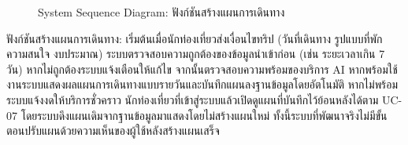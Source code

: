 \begin{figure}[H]
\centering
{}
\caption{System Sequence Diagram: ฟังก์ชันสร้างแผนการเดินทาง}
\label{fig:ssd_tourist_trip}
\end{figure}

ฟังก์ชันสร้างแผนการเดินทาง: เริ่มต้นเมื่อนักท่องเที่ยวส่งเงื่อนไขทริป (วันที่เดินทาง รูปแบบที่พัก ความสนใจ งบประมาณ) ระบบตรวจสอบความถูกต้องของข้อมูลนำเข้าก่อน (เช่น ระยะเวลาเกิน 7 วัน) หากไม่ถูกต้องระบบแจ้งเตือนให้แก้ไข จากนั้นตรวจสอบความพร้อมของบริการ AI หากพร้อมใช้งานระบบแสดงผลแผนการเดินทางแบบรายวันและบันทึกแผนลงฐานข้อมูลโดยอัตโนมัติ หากไม่พร้อมระบบแจ้งงดให้บริการชั่วคราว นักท่องเที่ยวที่เข้าสู่ระบบแล้วเปิดดูแผนที่บันทึกไว้ย้อนหลังได้ตาม UC-07 โดยระบบดึงแผนเดิมจากฐานข้อมูลมาแสดงโดยไม่สร้างแผนใหม่ ทั้งนี้ระบบที่พัฒนาจริงไม่มีขั้นตอนปรับแผนด้วยความเห็นของผู้ใช้หลังสร้างแผนเสร็จ

